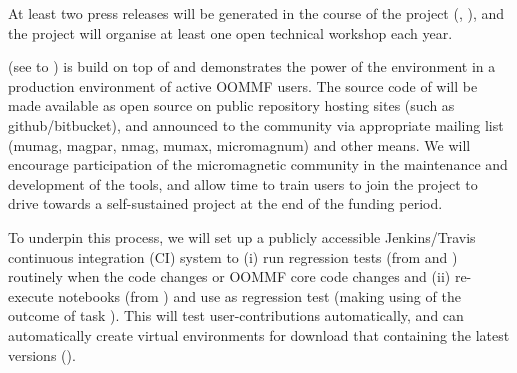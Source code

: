 \begin{workpackage}[id=dissem,wphases=18-48!.5,
  title=Dissemination,
  SARM=1,
  USORM=10,
  USHRM=8,
  USRM=24
]
\begin{tasklist}
\begin{task}[title=Dissemination and Communication activities]

  At least two press releases will be generated in the course of the
  project (, ), and
  the project will organise at least one open technical workshop each
  year. %
  
\end{task}

\begin{task}[id=dissemination-of-oommf-nb-virtual-environment,
  title=Open source dissemination of \OOMMFNB{} virtual environment]
  \OOMMFNB{} (see  to
  ) is build on top of \TheProject and demonstrates the power
  of the environment in a production environment of active OOMMF users. 
  The source code of \OOMMFNB{} will be made available as open source on
  public repository hosting sites (such as github/bitbucket), and
  announced to the community via appropriate mailing list (mumag,
  magpar, nmag, mumax, micromagnum) and other means. We will
  encourage participation of the micromagnetic community in the
  maintenance and development of the tools, and allow time to train
  users to join the \OOMMFNB{} project to drive towards a self-sustained
  \OOMMFNB{} project at the end of the funding period.

  To underpin this process, we will set up a publicly accessible
  Jenkins/Travis continuous integration (CI) system to (i) run
  regression tests (from  and ) routinely when the
  \OOMMFNB{} code changes or OOMMF core code changes and (ii)
  re-execute notebooks (from
  ) and use
  as regression test (making using of the outcome of task ). This will
  test user-contributions automatically, and can automatically create virtual environments
  for download that containing the latest versions ().


\end{task}
\end{tasklist}
\end{workpackage}
